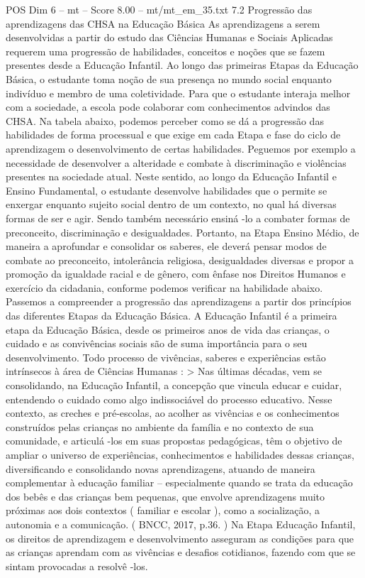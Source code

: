 \begin{textsample}{POS Dim 6 – mt – Score 8.00 – mt/mt\_em\_35.txt}  \label{ex:f6_pos_166}
7.2 Progressão das aprendizagens das CHSA na Educação Básica As aprendizagens a serem desenvolvidas a partir do estudo das Ciências Humanas e Sociais Aplicadas requerem uma progressão de habilidades, conceitos e noções que se fazem presentes desde a Educação Infantil.
Ao longo das primeiras Etapas da Educação Básica, o estudante toma noção de sua presença no mundo social enquanto indivíduo e membro de uma coletividade.
Para que o estudante interaja melhor com a sociedade, a escola pode colaborar com conhecimentos advindos das CHSA.
Na tabela abaixo, podemos perceber como se dá a progressão das habilidades de forma processual e que exige em cada Etapa e fase do ciclo de aprendizagem o desenvolvimento de certas habilidades.
Peguemos por exemplo a necessidade de desenvolver a alteridade e combate à discriminação e violências presentes na sociedade atual.
Neste sentido, ao longo da Educação Infantil e Ensino Fundamental, o estudante desenvolve habilidades que o permite se enxergar enquanto sujeito social dentro de um contexto, no qual há diversas formas de ser e agir.
Sendo também necessário ensiná -lo a combater formas de preconceito, discriminação e desigualdades.
Portanto, na Etapa Ensino Médio, de maneira a aprofundar e consolidar os saberes, ele deverá pensar modos de combate ao preconceito, intolerância religiosa, desigualdades diversas e propor a promoção da igualdade racial e de gênero, com ênfase nos Direitos Humanos e exercício da cidadania, conforme podemos verificar na habilidade abaixo.
Passemos a compreender a progressão das aprendizagens a partir dos princípios das diferentes Etapas da Educação Básica.
A Educação Infantil é a primeira etapa da Educação Básica, desde os primeiros anos de vida das crianças, o cuidado e as convivências sociais são de suma importância para o seu desenvolvimento.
Todo processo de vivências, saberes e experiências estão intrínsecos à área de Ciências Humanas : > Nas últimas décadas, vem se consolidando, na Educação Infantil, a concepção que vincula educar e cuidar, entendendo o cuidado como algo indissociável do processo educativo.
Nesse contexto, as creches e pré-escolas, ao acolher as vivências e os conhecimentos construídos pelas crianças no ambiente da família e no contexto de sua comunidade, e articulá -los em suas propostas pedagógicas, têm o objetivo de ampliar o universo de experiências, conhecimentos e habilidades dessas crianças, diversificando e consolidando novas aprendizagens, atuando de maneira complementar à educação familiar – especialmente quando se trata da educação dos bebês e das crianças bem pequenas, que envolve aprendizagens muito próximas aos dois contextos ( familiar e escolar ), como a socialização, a autonomia e a comunicação. ( BNCC, 2017, p.36. ) Na Etapa Educação Infantil, os direitos de aprendizagem e desenvolvimento asseguram as condições para que as crianças aprendam com as vivências e desafios cotidianos, fazendo com que se sintam provocadas a resolvê -los.

\end{textsample}
